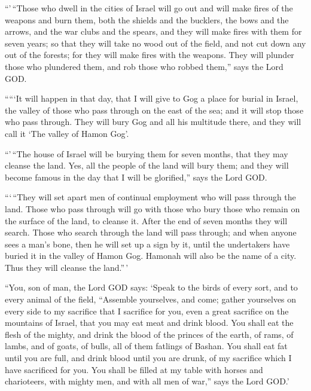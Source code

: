  ``'\,``Those who dwell in the cities of Israel will go
out and will make fires of the weapons and burn them, both the shields
and the bucklers, the bows and the arrows, and the war clubs and the
spears, and they will make fires with them for seven years;
 so that they will take no wood out of the field, and not
cut down any out of the forests; for they will make fires with the
weapons. They will plunder those who plundered them, and rob those who
robbed them,'' says the Lord GOD.

 `````It will happen in that day, that I will give to Gog
a place for burial in Israel, the valley of those who pass through on
the east of the sea; and it will stop those who pass through. They will
bury Gog and all his multitude there, and they will call it `The valley
of Hamon Gog'.

 ``'\,``The house of Israel will be burying them for
seven months, that they may cleanse the land.  Yes, all
the people of the land will bury them; and they will become famous in
the day that I will be glorified,'' says the Lord GOD.

 ```\,``They will set apart men of continual employment
who will pass through the land. Those who pass through will go with
those who bury those who remain on the surface of the land, to cleanse
it. After the end of seven months they will search. 
Those who search through the land will pass through; and when anyone
sees a man's bone, then he will set up a sign by it, until the
undertakers have buried it in the valley of Hamon Gog. 
Hamonah will also be the name of a city. Thus they will cleanse the
land.''\,'

 ``You, son of man, the Lord GOD says: `Speak to the
birds of every sort, and to every animal of the field, ``Assemble
yourselves, and come; gather yourselves on every side to my sacrifice
that I sacrifice for you, even a great sacrifice on the mountains of
Israel, that you may eat meat and drink blood.  You shall
eat the flesh of the mighty, and drink the blood of the princes of the
earth, of rams, of lambs, and of goats, of bulls, all of them fatlings
of Bashan.  You shall eat fat until you are full, and
drink blood until you are drunk, of my sacrifice which I have sacrificed
for you.  You shall be filled at my table with horses and
charioteers, with mighty men, and with all men of war,'' says the Lord
GOD.'

